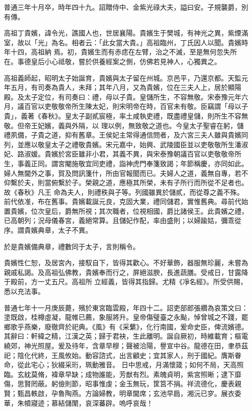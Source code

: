 \begin{pinyinscope}
 普通三年十月卒，時年四十九。詔贈侍中、金紫光祿大夫，謚曰安。子規襲爵，別有傳。



 高祖丁貴嬪，諱令光，譙國人也，世居襄陽。貴嬪生于樊城，有神光之異，紫煙滿室，故以「光」為名。相者云：「此女當大貴。」高祖臨州，丁氏因人以聞。貴嬪時年十四，高祖納
 焉。初，貴嬪生而有赤痣在左臂，治之不滅，至是無何忽失所在。事德皇后小心祗敬，嘗於供養經案之側，仿佛若見神人，心獨異之。



 高祖義師起，昭明太子始誕育，貴嬪與太子留在州城。京邑平，乃還京都。天監元年五月，有司奏為貴人，未拜；其年八月，又為貴嬪，位在三夫人上，居於顯陽殿。及太子定位，有司奏曰：禮，母以子貴。皇儲所生，不容無敬。宋泰豫元年六月，議百官以吏敬敬帝所生陳太妃，則宋明帝在時，百官未有敬。臣竊謂「母以子貴」，義著《春秋》。皇太子副貳宸極，率土咸執吏禮，既盡禮皇儲，則所生不容無敬。但帝王妃嬪，義與外隔，以
 理以例，無致敬之道也。今皇太子聖睿在躬，儲禮夙備，子貴之道，抑有舊章。王侯妃主常得通信問者，及六宮三夫人雖與貴嬪同列，並應以敬皇太子之禮敬貴嬪。宋元嘉中，始興、武陵國臣並以吏敬敬所生潘淑妃、路淑媛。貴嬪於宮臣雖非小君，其義不異，與宋泰豫朝議百官以吏敬敬帝所生，事義正同。謂宮閹施敬宜同吏禮，詣神虎門奉箋致謁；年節稱慶，亦同如此。婦人無閫外之事，賀及問訊箋什，所由官報聞而已。夫婦人之道，義無自專，若不仰繫於夫，則當俯繫於子。榮親之道，應極其所榮，未有子所行而所從不足者也。故《春秋》凡王
 命為夫人，則禮秩與子等。列國雖異於儲貳，而從尊之義不殊。前代依准，布在舊事。貴嬪載誕元良，克固大業，禮同儲君，實惟舊典。尋前代始置貴嬪，位次皇后，爵無所視；其次職者，位視相國，爵比諸侯王。此貴嬪之禮，已高朝列；況母儀春宮，義絕常算。且儲妃作配，率由盛則；以婦踰姑，彌乖從序。謂貴嬪典章，太子不異。



 於是貴嬪備典章，禮數同于太子，言則稱令。



 貴嬪性仁恕，及居宮內，接馭自下，皆得其歡心。不好華飾，器服無珍麗，未嘗為親戚私謁。及高祖弘佛教，貴嬪奉而行之，屏絕滋腴，長進蔬膳。受戒日，甘露降于殿前，方一丈五尺。高祖所
 立經義，皆得其指歸。尤精《凈名經》。所受供賜，悉以充法事。



 普通七年十一月庚辰薨，殯於東宮臨雲殿，年四十二。詔吏部郎張纘為哀策文曰：塗既啟，桂樽虛凝，龍帷已薦，象服將升。皇帝傷璧臺之永颭，悼曾城之不踐，罷鄉歌乎燕樂，廢徹齊於祀典。《風》有《采蘩》，化行南國，爰命史臣，俾流嬪德。其辭曰：軒緯之精，江漢之英；歸于君袂，生此離明。誕自厥初，時維載育；樞電繞郊，神光照屋。爰及待年，含章早穆；聲被洽陽，譽宣中谷。龍德在田，聿恭茲祀；陰化代終，王風攸始。動容諮式，出言顧史；宜其家人，刑于國紀。膺斯眷命，從此宅心；狄綴采珩，珮動雅音。
 日中思戒，月滿懷箴；如何不局，天高照臨。玄紞莫脩，褘章早缺；成物誰能，芳猷有烈。素魄貞明，紫宮照晰；逮下靡傷，思賢罔蔽。躬儉則節，昭事惟虔；金玉無玩，筐筥不捐。祥流德化，慶表親賢；甄昌軼啟，孕魯陶燕。方論婦教，明章閫席；玄池早扃，湘沅已穸。展衣委華，朱幩寢迹；慕結儲闈，哀深蕃辟。嗚呼哀哉！




\end{pinyinscope}
